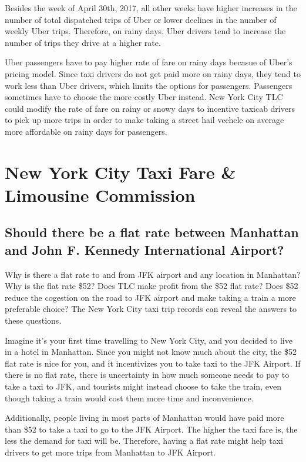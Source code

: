 \documentclass[12pt,twoside]{reedthesis}
\theoremstyle{definition}
\theoremstyle{definition}
\theoremstyle{definition}
\theoremstyle{remark}
\begin{document}
Besides the week of April 30th, 2017, all other weeks have higher
increases in the number of total dispatched trips of Uber or lower
declines in the number of weekly Uber trips. Therefore, on rainy days,
Uber drivers tend to increase the number of trips they drive at a higher
rate.

Uber passengers have to pay higher rate of fare on rainy days becasue of
Uber's pricing model. Since taxi drivers do not get paid more on rainy
days, they tend to work less than Uber drivers, which limits the options
for passengers. Passengers sometimes have to choose the more costly Uber
instead. New York City TLC could modify the rate of fare on rainy or
snowy days to incentive taxicab drivers to pick up more trips in order
to make taking a street hail vechcle on average more affordable on rainy
days for passengers.

\chapter{New York City Taxi Fare \& Limousine
Commission}\label{chapter5}

\section{Should there be a flat rate between Manhattan and John F.
Kennedy International
Airport?}\label{should-there-be-a-flat-rate-between-manhattan-and-john-f.-kennedy-international-airport}

Why is there a flat rate to and from JFK airport and any location in
Manhattan? Why is the flat rate \$52? Does TLC make profit from the \$52
flat rate? Does \$52 reduce the cogestion on the road to JFK airport and
make taking a train a more preferable choice? The New York City taxi
trip records can reveal the answers to these questions.

Imagine it's your first time travelling to New York City, and you
decided to live in a hotel in Manhattan. Since you might not know much
about the city, the \$52 flat rate is nice for you, and it incentivizes
you to take taxi to the JFK Airport. If there is no flat rate, there is
uncertainty in how much someone needs to pay to take a taxi to JFK, and
tourists might instead choose to take the train, even though taking a
train would cost them more time and inconvenience.

Additionally, people living in most parts of Manhattan would have paid
more than \$52 to take a taxi to go to the JFK Airport. The higher the
taxi fare is, the less the demand for taxi will be. Therefore, having a
flat rate might help taxi drivers to get more trips from Manhattan to
JFK Airport.
\end{document}

